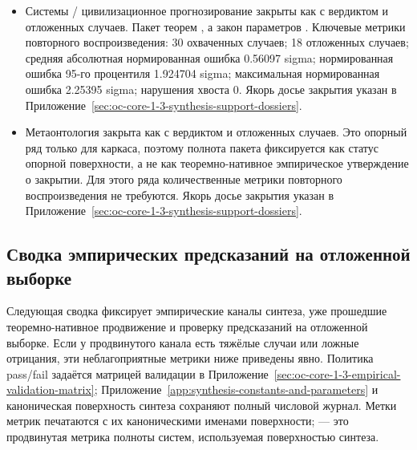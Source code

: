 \begin{itemize}[leftmargin=1.6em,nosep]
\item Системы / цивилизационное прогнозирование закрыты как  с вердиктом  и  отложенных случаев. Пакет теорем , а закон параметров . Ключевые метрики повторного воспроизведения: 30 охваченных случаев; 18 отложенных случаев; средняя абсолютная нормированная ошибка 0.56097 sigma; нормированная ошибка 95-го процентиля 1.924704 sigma; максимальная нормированная ошибка 2.25395 sigma; нарушения хвоста 0. Якорь досье закрытия указан в Приложение~\ref{sec:oc-core-1-3-synthesis-support-dossiers}.
\item Метаонтология закрыта как  с вердиктом  и  отложенных случаев. Это опорный ряд только для каркаса, поэтому полнота пакета фиксируется как статус опорной поверхности, а не как теоремно-нативное эмпирическое утверждение о закрытии. Для этого ряда количественные метрики повторного воспроизведения не требуются. Якорь досье закрытия указан в Приложение~\ref{sec:oc-core-1-3-synthesis-support-dossiers}.
\end{itemize}

\subsection{Сводка эмпирических предсказаний на отложенной выборке}
Следующая сводка фиксирует эмпирические каналы синтеза, уже прошедшие теоремно-нативное продвижение и проверку предсказаний на отложенной выборке.
Если у продвинутого канала есть тяжёлые случаи или ложные отрицания, эти неблагоприятные метрики ниже приведены явно. Политика pass/fail задаётся матрицей валидации в Приложение~\ref{sec:oc-core-1-3-empirical-validation-matrix}; Приложение~\ref{app:synthesis-constants-and-parameters} и каноническая поверхность синтеза сохраняют полный числовой журнал.
Метки метрик печатаются с их каноническими именами поверхности;  — это продвинутая метрика полноты систем, используемая поверхностью синтеза.

